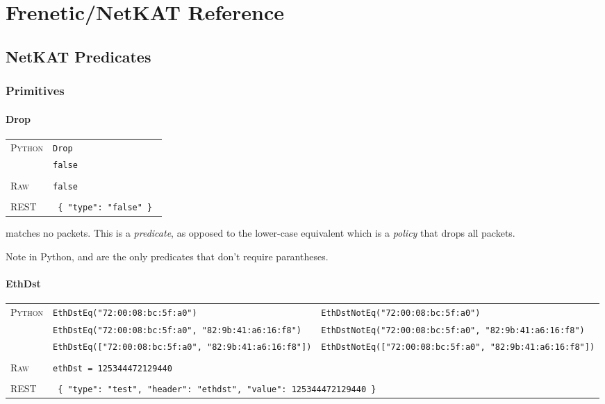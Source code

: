 
\chapter{Frenetic/NetKAT Reference}

\section{NetKAT Predicates}
\label{netkat_reference:predicates}

\subsection{Primitives}

\subsubsection{Drop}

\bigskip
\begin{tabularx}{\linewidth}{lX}
\textsc{Python}   & \texttt{Drop} \\
   & \texttt{false} \\ \\
\textsc{Raw}    & \texttt{false}  \\ \\
\textsc{REST} & \texttt{ \{ "type": "false" \} } 
\end{tabularx}

 matches no packets.  This is a \emph{predicate}, as opposed to the lower-case 
equivalent  
which is a \emph{policy} that drops all packets. 

Note in Python,  and  are the only predicates that don't require parantheses.

\subsubsection{EthDst}

\bigskip
\begin{tabularx}{\linewidth}{lXX}
\textsc{Python}   & \texttt{EthDstEq("72:00:08:bc:5f:a0")}    & \texttt{EthDstNotEq("72:00:08:bc:5f:a0")} \\
    & \texttt{EthDstEq("72:00:08:bc:5f:a0", "82:9b:41:a6:16:f8")}  & \texttt{EthDstNotEq("72:00:08:bc:5f:a0", "82:9b:41:a6:16:f8")} \\
    & \texttt{EthDstEq(["72:00:08:bc:5f:a0", "82:9b:41:a6:16:f8"])}  & \texttt{EthDstNotEq(["72:00:08:bc:5f:a0", "82:9b:41:a6:16:f8"])} \\ \\
\textsc{Raw}    & \texttt{ethDst = 125344472129440}     & \\ \\
\textsc{REST} & \multicolumn{2}{l}{\texttt{ \{ "type": "test", "header": "ethdst", "value": 125344472129440 \} }} 
\end{tabularx}

